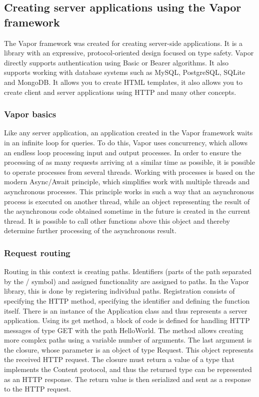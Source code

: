 \documentclass[
  language=english,
  figures=false,
  sourcecodes,
  index
]{kidiplom}
\begin{document}
\subsection{Creating server applications using the Vapor framework}
The Vapor framework was created for creating server-side applications. It is a library with an expressive, protocol-oriented design focused on type safety. Vapor directly supports authentication using Basic or Bearer algorithms. It also supports working with database systems such as MySQL, PostgreSQL, SQLite and MongoDB. It allows you to create HTML templates, it also allows you to create client and server applications using HTTP and many other concepts.

\subsubsection{Vapor basics}
Like any server application, an application created in the Vapor framework waits in an infinite loop for queries. To do this, Vapor uses concurrency, which allows an endless loop processing input and output processes. In order to ensure the processing of as many requests arriving at a similar time as possible, it is possible to operate processes from several threads. Working with processes is based on the modern Async/Await principle, which simplifies work with multiple threads and asynchronous processes.
This principle works in such a way that an asynchronous process is executed on another thread, while an object representing the result of the asynchronous code obtained sometime in the future is created in the current thread. It is possible to call other functions above this object and thereby determine further processing of the asynchronous result.

\subsubsection{Request routing}
Routing in this context is creating paths. Identifiers (parts of the path separated by the / symbol) and assigned functionality are assigned to paths. In the Vapor library, this is done by registering individual paths. Registration consists of specifying the HTTP method, specifying the identifier and defining the function itself.
There is an instance of the Application class and thus represents a server application. Using its get method, a block of code is defined for handling HTTP messages of type GET with the path HelloWorld. The method allows creating more complex paths using a variable number of arguments. The last argument is the closure, whose parameter is an object of type Request. This object represents the received HTTP request. The closure must return a value of a type that implements the Content protocol, and thus the returned type can be represented as an HTTP response. The return value is then serialized and sent as a response to the HTTP request.
\end{document}
